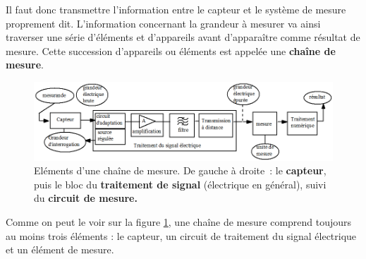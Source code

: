 Il faut donc transmettre l'information entre le capteur et le système de mesure proprement dit. L'information concernant la grandeur à mesurer va ainsi traverser une série d'éléments et d'appareils avant d'apparaître comme résultat de mesure. Cette succession d'appareils ou éléments est appelée une \textbf{chaîne de mesure}.

\begin{center}
\end{center}

\begin{figure}[h]
   \centering
   \vspace{-5mm}
   \includegraphics[width=\textwidth]{assets/figures/1_1_chaine_de_mesure.png}
   \caption{Eléments d'une chaîne de mesure. De gauche à droite~: le \textbf{capteur}, puis le bloc du \textbf{traitement de signal} (électrique en général), suivi du \textbf{circuit de mesure.}}
   \label{fig:chaine_de_mesure}
\end{figure}
Comme on peut le voir sur la figure \ref{fig:chaine_de_mesure}, une chaîne de mesure comprend toujours au moins trois éléments : le capteur, un circuit de traitement du signal électrique et un élément de mesure.

